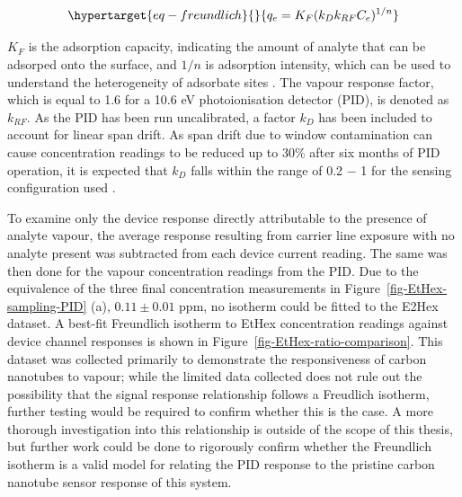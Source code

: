 \documentclass[
  a4paper,
]{scrbook}
\begin{document}
\begin{equation}\protect\hypertarget{eq-freundlich}{}{
q_e = K_F(k_Dk_{RF}C_e)^{1/n}
}\label{eq-freundlich}\end{equation}

\(K_F\) is the adsorption capacity, indicating the amount of analyte
that can be adsorped onto the surface, and \(1/n\) is adsorption
intensity, which can be used to understand the heterogeneity of
adsorbate sites \autocite{Ayawei2017,Sabzehmeidani2021}. The vapour
response factor, which is equal to 1.6 for a 10.6 eV photoionisation
detector (PID), is denoted as \(k_{RF}\). As the PID has been run
uncalibrated, a factor \(k_{D}\) has been included to account for linear
span drift. As span drift due to window contamination can cause
concentration readings to be reduced up to 30\% after six months of PID
operation, it is expected that \(k_{D}\) falls within the range of 0.2
\(-\) 1 for the sensing configuration used
\autocite{PIDmanual,Ionscience}.

To examine only the device response directly attributable to the
presence of analyte vapour, the average response resulting from carrier
line exposure with no analyte present was subtracted from each device
current reading. The same was then done for the vapour concentration
readings from the PID. Due to the equivalence of the three final
concentration measurements in Figure~\ref{fig-EtHex-sampling-PID} (a),
\(0.11 \pm 0.01\) ppm, no isotherm could be fitted to the E2Hex dataset.
A best-fit Freundlich isotherm to EtHex concentration readings against
device channel responses is shown in
Figure~\ref{fig-EtHex-ratio-comparison}. This dataset was collected
primarily to demonstrate the responsiveness of carbon nanotubes to
vapour; while the limited data collected does not rule out the
possibility that the signal response relationship follows a Freudlich
isotherm, further testing would be required to confirm whether this is
the case. A more thorough investigation into this relationship is
outside of the scope of this thesis, but further work could be done to
rigorously confirm whether the Freundlich isotherm is a valid model for
relating the PID response to the pristine carbon nanotube sensor
response of this system.
\end{document}
